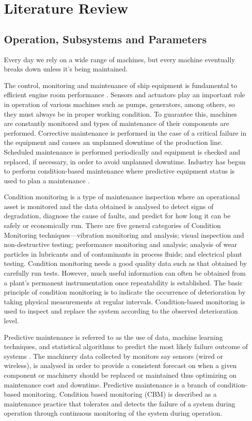 \section{Literature Review}
\subsection{Operation, Subsystems and Parameters}
Every day we rely on a wide range of machines, but every machine eventually breaks down unless it’s being maintained.  

The control, monitoring and maintenance of ship equipment is fundamental to efficient engine room performance . Sensors and actuators play an important role in operation of various machines such as pumps, generators, among others, so they must always be in proper working condition. To guarantee this, machines are constantly monitored and types of maintenance of their components are performed. Corrective maintenance is performed in the case of a critical failure in the equipment and causes an unplanned downtime of the production line. Scheduled maintenance is performed periodically and equipment is checked and replaced, if necessary, in order to avoid unplanned downtime. Industry has begun to perform condition-based maintenance where predictive equipment status is used to plan a maintenance \cite{noauthor_predictive_nodate}.

Condition monitoring is a type of maintenance inspection where an operational asset is monitored and the data obtained is analysed to detect signs of degradation, diagnose the cause of faults, and predict for how long it can be safely or economically run. There are five general categories of Condition Monitoring techniques—vibration monitoring and analysis; visual inspection and non-destructive testing; performance monitoring and analysis; analysis of wear particles in lubricants and of contaminants in process fluids; and electrical plant testing. Condition monitoring needs a good quality data such as that obtained by carefully run tests. However, much useful information can often be obtained from a plant’s permanent instrumentation once repeatability is established\cite{lu_condition_2018}. The basic principle of condition monitoring is to indicate the occurrence of deterioration by taking physical measurements at regular intervals. Condition-based monitoring is used to inspect and replace the system according to the observed deterioration level. 

Predictive maintenance is referred to as the use of data, machine learning techniques, and statistical algorithms to predict the most likely failure outcome of systems \cite{tinga_predictive_2017}. The machinery data collected by monitors say sensors (wired or wireless), is analysed in order to provide a consistent forecast on when a given component or machinery should be replaced or maintained thus optimizing on maintenance cost and downtime. Predictive maintenance is a branch of condition-based monitoring. Condition based monitoring (CBM) is described as a maintenance practice that tolerates and detects the failure of a system during operation through continuous monitoring of the system during operation\cite{kimera_predictive_2020}. 

